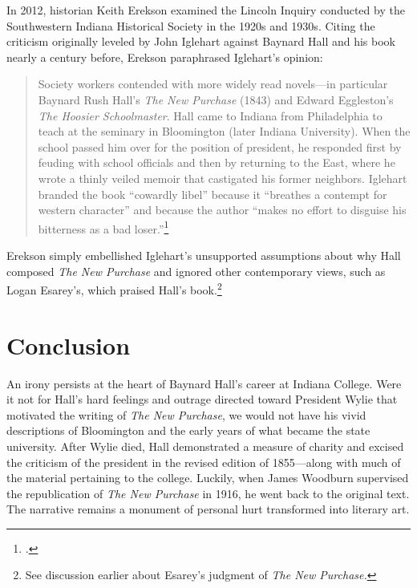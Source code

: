 \documentclass[
  american,
  letterpaper,
]{scrreprt}
\begin{document}
In 2012, historian Keith Erekson examined the Lincoln Inquiry conducted
by the Southwestern Indiana Historical Society in the 1920s and 1930s.
Citing the criticism originally leveled by John Iglehart against Baynard
Hall and his book nearly a century before, Erekson paraphrased
Iglehart's opinion:

\begin{quote}
Society workers contended with more widely read novels---in particular
Baynard Rush Hall's \emph{The New Purchase} (1843) and Edward
Eggleston's \emph{The Hoosier Schoolmaster}. Hall came to Indiana from
Philadelphia to teach at the seminary in Bloomington (later Indiana
University). When the school passed him over for the position of
president, he responded first by feuding with school officials and then
by returning to the East, where he wrote a thinly veiled memoir that
castigated his former neighbors. Iglehart branded the book ``cowardly
libel'' because it ``breathes a contempt for western character'' and
because the author ``makes no effort to disguise his bitterness as a bad
loser.''\footnote{.}
\end{quote}

Erekson simply embellished Iglehart's unsupported assumptions about why
Hall composed \emph{The New Purchase} and ignored other contemporary
views, such as Logan Esarey's, which praised Hall's book.\footnote{See
  discussion earlier about Esarey's judgment of \emph{The New Purchase.}}

\section{Conclusion}\label{conclusion}

An irony persists at the heart of Baynard Hall's career at Indiana
College. Were it not for Hall's hard feelings and outrage directed
toward President Wylie that motivated the writing of \emph{The New
Purchase}, we would not have his vivid descriptions of Bloomington and
the early years of what became the state university. After Wylie died,
Hall demonstrated a measure of charity and excised the criticism of the
president in the revised edition of 1855---along with much of the
material pertaining to the college. Luckily, when James Woodburn
supervised the republication of \emph{The New Purchase} in 1916, he went
back to the original text. The narrative remains a monument of personal
hurt transformed into literary art.
\end{document}
